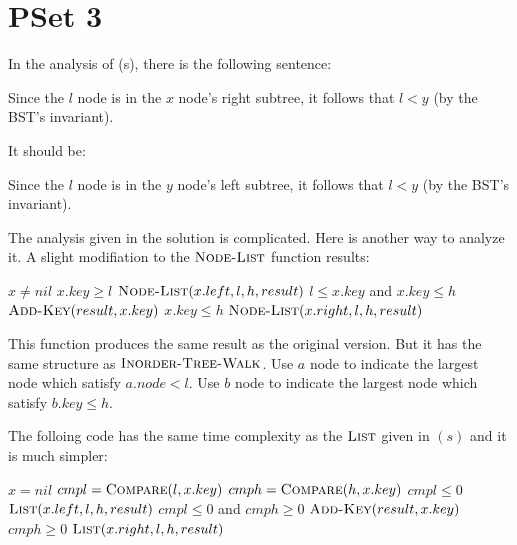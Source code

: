 \documentclass[12pt,twoside]{article}
\begin{document}
\section{PSet 3}

In the analysis of (s), there is the following sentence:

\begin{displayquote}
Since the $l$ node is in the $x$ node's right subtree, it follows that $l < y$ (by the BST’s invariant).
\end{displayquote}


It should be:


\begin{displayquote}
Since the $l$ node is in the $y$ node's left subtree, it follows that $l < y$ (by the BST’s invariant).
\end{displayquote}

The analysis given in the solution is complicated. Here is another way to
analyze it. A slight modifiation to the $\textnormal{\scshape Node-List}$ function results:

\begin{codebox}
\li \If $x \ne nil$
\li \Then \If $x.key \ge l$
\li \Then $\textnormal{\scshape Node-List}(x.left, l, h, result)$
\End
\li \If $l \le x.key$ and $x.key \le h$
\li \Then $\textnormal{\scshape Add-Key}(result, x.key)$
\End
\li \If $x.key \le h$
\li \Then $\textnormal{\scshape Node-List}(x.right, l, h, result)$
\End
\End
\end{codebox}

This function produces the same result as the original version. But it has the
same structure as $\textnormal{\scshape Inorder-Tree-Walk}$. Use $a$ node to indicate the
largest node which satisfy $a.node < l$. Use $b$ node to indicate the largest 
node which satisfy $b.key \le  h$.


The folloing code has the same time complexity as the $\textnormal{\scshape List}$ given in
$(s)$ and it is much simpler:

\begin{codebox}
\li \If $x = nil$
\li \Then \Return
\End
\li $cmpl = \textnormal{\scshape Compare}(l, x.key)$
\li $cmph = \textnormal{\scshape Compare}(h, x.key)$
\li \If $cmpl \le 0$
\li \Then $\textnormal{\scshape List}(x.left, l, h, result)$
\End
\li \If $cmpl \le 0$ and $cmph \ge 0$
\li \Then $\textnormal{\scshape Add-Key}(result, x.key)$
\End
\li \If $cmph \ge 0$
\li \Then $\textnormal{\scshape List}(x.right, l, h, result)$
\End



\end{codebox}
\end{document}
